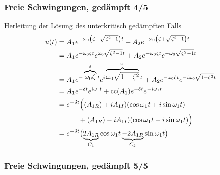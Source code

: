 \documentclass[hyperref={pdfpagemode=FullScreen, colorlinks=false}]{beamer}
\begin{document}
\begin{frame}
\frametitle{Freie Schwingungen, {\normalsize gedämpft 4/5}}
Herleitung der Lösung des unterkritisch gedämpften Falls
\begin{align*}
 u(t)  &=A_1 e^{-\omega_0\left( \zeta-\sqrt{ \zeta^2-1}\right)t}
  +A_2 e^{-\omega_0\left( \zeta+\sqrt{ \zeta^2-1}\right)t}\\
  &=A_1 e^{-\omega_0 \zeta t}e^{\omega_0 \sqrt{ \zeta^2-1}t}
  +A_2 e^{-\omega_0 \zeta t}e^{-\omega_0 \sqrt{ \zeta^2-1}t}\\
  &=A_1 e^{-\overbrace{\omega_0 \zeta}^{\delta} t}e^{i\overbrace{\omega_0 \sqrt{1-\zeta^2}}^{\omega_1}t}
  +A_2 e^{-\omega_0 \zeta t}e^{-i\omega_0 \sqrt{1-\zeta^2}t}\\
  &=A_1 e^{-\delta t}e^{i\omega_1t}+\mathrm{cc}(A_1) e^{-\delta t}e^{-i\omega_1t}\\
  &= e^{-\delta t}\Bigl( (A_{1R})+i A_{1I}) (\cos\omega_1 t + i \sin \omega_1 t  )\\
  & \qquad \quad +(A_{1R})-i A_{1I}) (\cos\omega_1 t - i \sin \omega_1 t)  \Bigr)\\
  &=e^{-\delta t}\bigl( \underbrace{2A_{1R}}_{C_1}\cos \omega_1 t 
  \underbrace{- 2A_{1R}}_{C_2}\sin \omega_1 t   \bigr)
 \end{align*}
\end{frame}


\begin{frame}
\frametitle{Freie Schwingungen, {\normalsize gedämpft 5/5}}



\end{frame}




\end{document}
